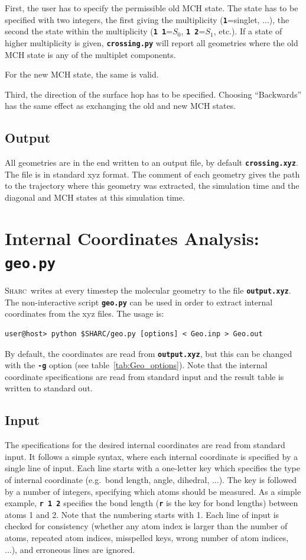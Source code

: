 \documentclass[a4paper,11pt,DIV=15,openany,twoside=false]{scrbook}
\newcommand{\sharc}{\textsc{Sharc}}
\newcommand{\ttt}[1]{\textbf{\texttt{#1}}}
\begin{document}
First, the user has to specify the permissible old MCH state. The state has to be specified with two integers, the first giving the multiplicity (\ttt{1}=singlet, ...), the second the state within the multiplicity (\ttt{1 1}=$S_0$, \ttt{1 2}=$S_1$, etc.). If a state of higher multiplicity is given, \ttt{crossing.py} will report all geometries where the old MCH state is any of the multiplet components. 

For the new MCH state, the same is valid.

Third, the direction of the surface hop has to be specified. Choosing ``Backwards'' has the same effect as exchanging the old and new MCH states. 

\subsection{Output}

All geometries are in the end written to an output file, by default \ttt{crossing.xyz}. The file is in standard xyz format. The comment of each geometry gives the path to the trajectory where this geometry was extracted, the simulation time and the diagonal and MCH states at this simulation time. 





\section{Internal Coordinates Analysis: \ttt{geo.py}}\label{sec:geo.py}

\sharc\ writes at every timestep the molecular geometry to the file \ttt{output.xyz}. The non-interactive script \ttt{geo.py} can be used in order to extract internal coordinates from the xyz files. The usage is:
\begin{verbatim}
user@host> python $SHARC/geo.py [options] < Geo.inp > Geo.out
\end{verbatim}
By default, the coordinates are read from \ttt{output.xyz}, but this can be changed with the \ttt{-g} option (see table~\ref{tab:Geo_options}). Note that the internal coordinate specifications are read from standard input and the result table is written to standard out. 

\subsection{Input}

The specifications for the desired internal coordinates are read from standard input. It follows a simple syntax, where each internal coordinate is specified by a single line of input. Each line starts with a one-letter key which specifies the type of internal coordinate (e.g.\ bond length, angle, dihedral, ...). The key is followed by a number of integers, specifying which atoms should be measured. As a simple example, \ttt{r 1 2} specifies the bond length (\ttt{r} is the key for bond lengths) between atoms 1 and 2. Note that the numbering starts with 1. Each line of input is checked for consistency (whether any atom index is larger than the number of atoms, repeated atom indices, misspelled keys, wrong number of atom indices, ...), and erroneous lines are ignored.
\end{document}
